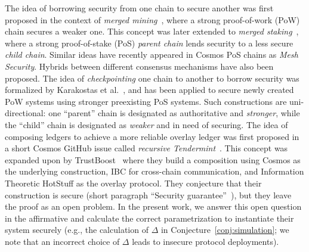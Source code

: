 The idea of borrowing security from one chain to
secure another was first proposed in the context of \emph{merged mining}~\cite{namecoin}, where
a strong proof-of-work (PoW) chain secures a weaker one. This
concept was later extended to \emph{merged staking}~\cite{pos-sidechains}, where a
strong proof-of-stake (PoS) \emph{parent chain} lends security to a less secure
\emph{child chain}. Similar ideas have recently appeared in Cosmos PoS
chains as \emph{Mesh Security}. Hybrids between different consensus mechanisms
have also been proposed. The idea of \emph{checkpointing}
one chain to another to borrow security was formalized by Karakostas et al.~\cite{karakostas2021securing},
and has been applied to secure newly created PoW systems using stronger
preexisting PoS systems. Such constructions are uni-directional:
one ``parent'' chain is designated as authoritative and \emph{stronger},
while the ``child'' chain is designated as \emph{weaker} and in need of securing.
The idea of composing ledgers to achieve a more reliable overlay ledger
was first proposed in a short Cosmos GitHub issue called
\emph{recursive Tendermint}~\cite{recursive-tendermint}.
This concept was expanded upon by TrustBoost~\cite{trustboost}
where they build a composition using Cosmos as the underlying
construction, IBC for cross-chain communication, and Information Theoretic
HotStuff as the overlay protocol. They conjecture that their construction
is secure (short paragraph ``Security guarantee''~\cite[Section 4.1]{trustboost}),
but they leave the proof as an open problem. In the present work, we
answer this open question in the affirmative and calculate the correct
parametrization to instantiate their system securely (e.g., the calculation
of $\Delta$ in Conjecture~\ref{conj:simulation}; we note that an incorrect
choice of $\Delta$ leads to insecure protocol deployments).


